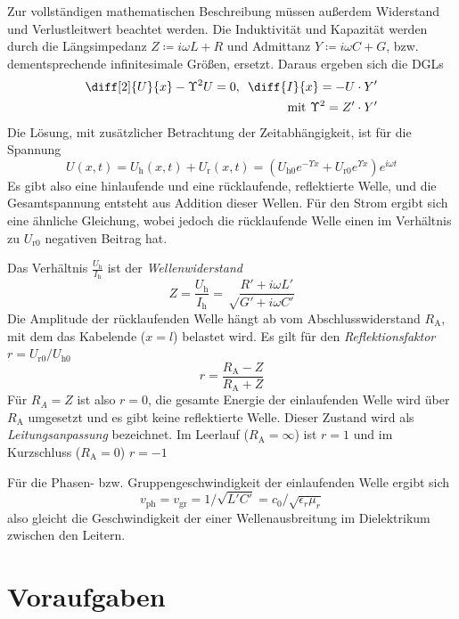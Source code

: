\documentclass{article}
\newcommand{\subsectionAlph}{ \renewcommand{\thesubsection}{\arabic{section}.\Alph{subsection}} }
\newcommand{\defc}{black}
\newcommand{\colorT}[2][blue]{\color{#1}{#2}\color{\defc}}
\newcommand{\question}[1]{\colorT[purple]{\textbf{(#1)}}}
\newcommand{\todo}[1]{\colorT[red]{\textbf{(#1)}}}
\newcommand{\mr}{\mathrm}
\begin{document}
Zur vollständigen mathematischen Beschreibung müssen außerdem Widerstand und Verlustleitwert beachtet werden.
Die Induktivität und Kapazität werden durch die Längsimpedanz $Z \coloneq i\omega L + R$
und Admittanz $Y \coloneq i\omega C + G$, bzw. dementsprechende infinitesimale Größen, ersetzt.
Daraus ergeben sich die DGLs
\begin{align}
  \diff[2]{U}{x} - \Upsilon^2U = 0, \enspace \diff{I}{x} = -U\cdot Y'\\
  \text{mit } \Upsilon^2 = Z'\cdot Y' \nonumber
\end{align}
Die Lösung, mit zusätzlicher Betrachtung der Zeitabhängigkeit, ist für die Spannung
\begin{equation}
  U(x, t) = U_\mr h (x, t) + U_\mr r (x, t) = (U_{\mr h0} e^{-\Upsilon x} + U_{\mr r0} e^{\Upsilon x}) e^{i\omega t} 
\end{equation}
\todo{wo kommt $\omega$ her?}
Es gibt also eine hinlaufende und eine rücklaufende, reflektierte Welle, und die Gesamtspannung entsteht aus Addition dieser Wellen.
Für den Strom ergibt sich eine ähnliche Gleichung, wobei jedoch die rücklaufende Welle einen im Verhältnis zu $U_{\mr r0}$ negativen Beitrag hat.

Das Verhältnis $\frac{U_\mr h}{I_\mr h}$ ist der
\textit{Wellenwiderstand}
\begin{equation}
  Z = \frac{U_\mr h}{I_\mr h} = \sqrt\frac{R' + i\omega L'}{G' + i\omega C'}
\end{equation}
Die Amplitude der rücklaufenden Welle hängt ab vom Abschlusswiderstand
$R_\mr A$, mit dem das Kabelende ($x = l$) belastet wird. Es gilt für den \textit{Reflektionsfaktor} $r = U_{\mr r0} / U_{\mr h0}$
\begin{equation}
  r = \frac{R_\mr A - Z}{R_\mr A + Z}
\end{equation}
Für $R_A = Z$ \question{ist RA dann komplex?} ist also $r = 0$, die gesamte Energie der einlaufenden Welle wird über $R_\mr A$ umgesetzt
und es gibt keine reflektierte Welle. Dieser Zustand wird als \textit{Leitungsanpassung} bezeichnet. Im Leerlauf ($R_\mr A = \infty$)
ist $r=1$ und im Kurzschluss ($R_\mr A = 0$) $r=-1$

Für die Phasen- bzw. Gruppengeschwindigkeit der einlaufenden Welle ergibt sich
\begin{equation}
  v_\mr{ph} = v_\mr{gr} = 1/\sqrt{L'C'} = c_0/\sqrt{\epsilon_r \mu_r}
\end{equation}
also gleicht die Geschwindigkeit der einer Wellenausbreitung im Dielektrikum zwischen den Leitern.



\section{Voraufgaben}
\begingroup
\subsectionAlph

\subsection{}
\subsection{}
\subsection{}

\endgroup
\end{document}

